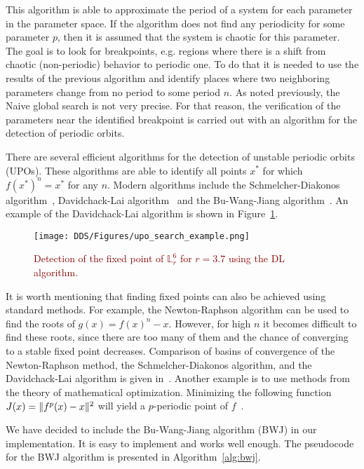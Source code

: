 This algorithm is able to approximate the period of a system for each parameter in the parameter space.
If the algorithm does not find any periodicity for some parameter $p$, then it is assumed that the system is chaotic for this parameter.
The goal is to look for breakpoints, e.g. regions where there is a shift from chaotic (non-periodic) behavior to periodic one.
To do that it is needed to use the results of the previous algorithm and identify places where two neighboring parameters change from no period to some period $n$.
As noted previously, the Naive global search is not very precise. For that reason, the verification of the parameters near the identified breakpoint is carried out with an algorithm for the detection of periodic orbits.
\par
There are several efficient algorithms for the detection of unstable periodic orbits (UPOs).
These algorithms are able to identify all points $x^{*}$ for which $f(x^{*})^{n}=x^{*}$ for any $n$.
Modern algorithms include the Schmelcher-Diakonos algorithm~\cite{Schmelcher1997}, Davidchack-Lai algorithm~\cite{Davidchack1999, Davidchack2001, Klebanoff2001, Crofts2007} and the Bu-Wang-Jiang algorithm~\cite{Bu2004}.
An example of the Davidchack-Lai algorithm is shown in Figure~\ref{fig:upo_search_example}.

\begin{figure}[!h]
    \centering
    \texttt{[image: DDS/Figures/upo\_search\_example.png]}
    \caption{
        \textcolor{darkred}{
        Detection of the fixed point of $\mathbb{L}_{r}^{6}$ for $r = 3.7$ using the DL algorithm.
        }
    }
    \label{fig:upo_search_example}
\end{figure}

\par
It is worth mentioning that finding fixed points can also be achieved using standard methods.
For example, the Newton-Raphson algorithm can be used to find the roots of $g(x) = f(x)^{n} - x$.
However, for high $n$ it becomes difficult to find these roots, since there are too many of them and the chance of converging to a stable fixed point decreases.
Comparison of basins of convergence of the Newton-Raphson method, the Schmelcher-Diakonos algorithm, and the Davidchack-Lai algorithm is given in~\cite{Davidchack1999}.
Another example is to use methods from the theory of mathematical optimization.
Minimizing the following function $J(x)= \lVert f^{p}(x)-x\rVert^{2}$ will yield a $p$-periodic point of $f$~\cite{Fuh2009}.
\par
We have decided to include the Bu-Wang-Jiang algorithm (BWJ) in our implementation.
It is easy to implement and works well enough.
The pseudocode for the BWJ algorithm is presented in Algorithm~\ref{alg:bwj}.

